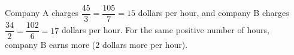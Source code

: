 Company A charges $\dfrac{45}{3}=\dfrac{105}{7}=15$ dollars per hour, and company B charges $\dfrac{34}{2}=\dfrac{102}{6}=17$ dollars per hour. For the same positive number of hours, $\boxed{\text{company B}}$ earns more ($2$ dollars more per hour).
